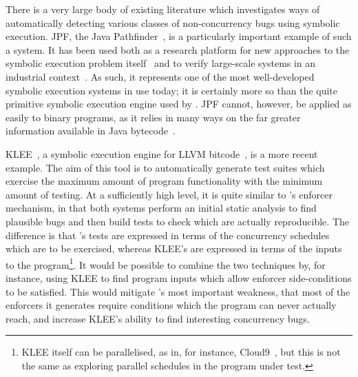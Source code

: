 There is a very large body of existing literature which investigates
ways of automatically detecting various classes of non-concurrency
bugs using symbolic execution.  JPF, the Java
Pathfinder~\cite{Havelund2000}, is a particularly important example of
such a system.  It has been used both as a research platform for new
approaches to the symbolic execution problem
itself~\cite{D'Amorim2008,Gligoric2010} and to verify large-scale
systems in an industrial context~\cite{PCZsCZreanu2008}.  As such, it
represents one of the most well-developed symbolic execution systems
in use today; it is certainly more so than the quite primitive
symbolic execution engine used by {\implementation}.  JPF cannot,
however, be applied as easily to binary programs, as it relies in many
ways on the far greater information available in Java
bytecode~\cite{Lindholm2013}.

KLEE~\cite{Cadar}, a symbolic execution engine for LLVM
bitcode~\cite{Lattner2013}, is a more recent example.  The aim of this
tool is to automatically generate test suites which exercise the
maximum amount of program functionality with the minimum amount of
testing.  At a sufficiently high level, it is quite similar to
{\technique}'s enforcer mechanism, in that both systems perform an
initial static analysis to find plausible bugs and then build tests to
check which are actually reproducible.  The difference is that
{\technique}'s tests are expressed in terms of the concurrency
schedules which are to be exercised, whereas KLEE's are expressed in
terms of the inputs to the program\footnote{KLEE itself can be
  parallelised, as in, for instance, Cloud9~\cite{Ciortea2010}, but
  this is not the same as exploring parallel schedules in the program
  under test.}\hspace{-.9ex}.  It would be possible to combine the two techniques
by, for instance, using KLEE to find program inputs which allow
{\technique} enforcer side-conditions to be satisfied.  This would
mitigate {\technique}'s most important weakness, that most of the
enforcers it generates require conditions which the program can never
actually reach, and increase KLEE's ability to find interesting
concurrency bugs.

